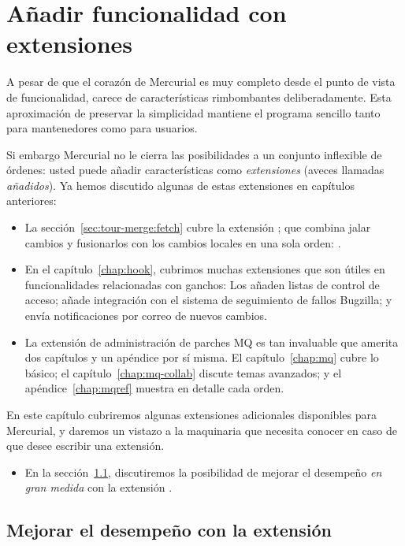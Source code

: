 \chapter{Añadir funcionalidad con extensiones}
\label{chap:hgext}

A pesar de que el corazón de Mercurial es muy completo desde el punto
de vista de funcionalidad, carece de características rimbombantes
deliberadamente.  Esta aproximación de preservar la simplicidad
mantiene el programa sencillo tanto para mantenedores como para
usuarios.

Si embargo Mercurial no le cierra las posibilidades a un conjunto
inflexible de órdenes: usted puede añadir características como
\emph{extensiones} (aveces llamadas \emph{añadidos}).  Ya
hemos discutido algunas de estas extensiones en capítulos anteriores:
\begin{itemize}
\item La sección~\ref{sec:tour-merge:fetch} cubre la extensión
  ; que combina jalar cambios y fusionarlos con los
  cambios locales en una sola orden: .
\item En el capítulo~\ref{chap:hook}, cubrimos muchas extensiones que
  son útiles en funcionalidades relacionadas con ganchos: Los
   añaden listas de control de acceso; 
  añade integración con el sistema de seguimiento de fallos Bugzilla; y
   envía notificaciones por correo de nuevos cambios.
\item La extensión de administración de parches MQ es tan invaluable
  que amerita dos capítulos y un apéndice por sí misma.
  El capítulo~\ref{chap:mq} cubre lo básico; el
  capítulo~\ref{chap:mq-collab} discute temas avanzados; y el
  apéndice~\ref{chap:mqref} muestra en detalle cada orden.
\end{itemize}

En este capítulo cubriremos algunas extensiones adicionales
disponibles para Mercurial, y daremos un vistazo a la maquinaria que
necesita conocer en caso de que desee escribir una extensión.
\begin{itemize}
\item En la sección~\ref{sec:hgext:inotify}, discutiremos la
  posibilidad de mejorar el desempeño \emph{en gran medida} con la extensión
  .
\end{itemize}

\section{Mejorar el desempeño con la extensión }
\label{sec:hgext:inotify}

